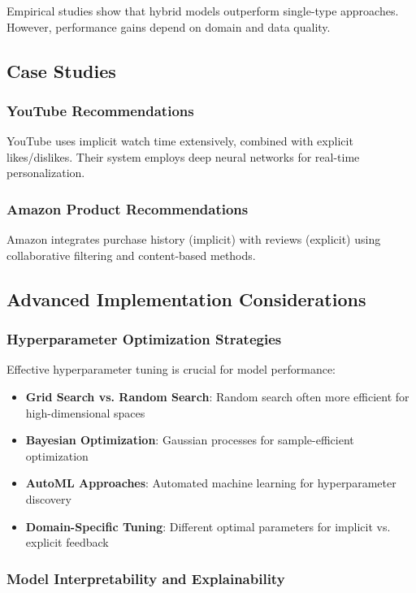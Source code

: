 \documentclass[acmsmall,review,anonymous]{acmart}
\begin{document}
Empirical studies show that hybrid models outperform single-type approaches. However, performance gains depend on domain and data quality.

\subsection{Case Studies}

\subsubsection{YouTube Recommendations}

YouTube uses implicit watch time extensively, combined with explicit likes/dislikes. Their system employs deep neural networks for real-time personalization.

\subsubsection{Amazon Product Recommendations}

Amazon integrates purchase history (implicit) with reviews (explicit) using collaborative filtering and content-based methods.

\subsection{Advanced Implementation Considerations}

\subsubsection{Hyperparameter Optimization Strategies}

Effective hyperparameter tuning is crucial for model performance:

\begin{itemize}
    \item \textbf{Grid Search vs. Random Search}: Random search often more efficient for high-dimensional spaces
    \item \textbf{Bayesian Optimization}: Gaussian processes for sample-efficient optimization
    \item \textbf{AutoML Approaches}: Automated machine learning for hyperparameter discovery
    \item \textbf{Domain-Specific Tuning}: Different optimal parameters for implicit vs. explicit feedback
\end{itemize}

\subsubsection{Model Interpretability and Explainability}
\end{document}
